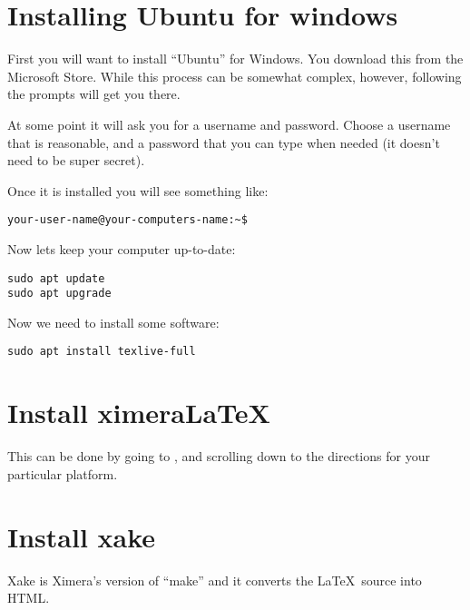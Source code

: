 \documentclass{ximera}
\begin{document}
\section{Installing Ubuntu for windows}





First you will want to install ``Ubuntu'' for Windows. You download
this from the Microsoft Store. While this process can be somewhat
complex, however, following the prompts will get you there.

At some point it will ask you for a username and password. Choose a
username that is reasonable, and a password that you can type when
needed (it doesn't need to be super secret).

Once it is installed you will see something like:

\begin{verbatim}
your-user-name@your-computers-name:~$
\end{verbatim}

Now lets keep your computer up-to-date:

\begin{verbatim}
sudo apt update
sudo apt upgrade
\end{verbatim}

Now we need to install some software:

\begin{verbatim}
sudo apt install texlive-full 
\end{verbatim}



\section{Install ximeraLaTeX}

This can be done by going to , and scrolling
down to the directions for your particular platform.


\section{Install xake}

Xake is Ximera's version of ``make'' and it converts the
\LaTeX\ source into HTML.
\end{document}

